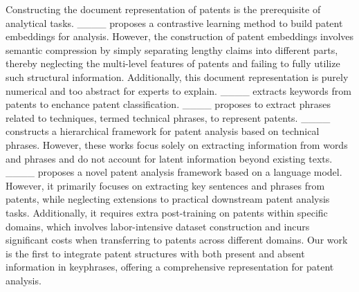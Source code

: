 Constructing the document representation of patents is the prerequisite of analytical tasks.
____ proposes a contrastive learning method to build patent embeddings for analysis. However, the construction of patent embeddings involves semantic compression by simply separating lengthy claims into different parts, thereby neglecting the multi-level features of patents and failing to fully utilize such structural information. Additionally, this document representation is purely numerical and too abstract for experts to explain.
____ extracts keywords from patents to enchance patent classification. ____ proposes to extract phrases related to techniques, termed technical phrases, to represent patents. ____ constructs a hierarchical framework for patent analysis based on technical phrases. However, these works focus solely on extracting information from words and phrases and do not account for latent information beyond existing texts.
____ proposes a novel patent analysis framework based on a language model. However, it primarily focuses on extracting key sentences and phrases from patents, while neglecting extensions to practical downstream patent analysis tasks. Additionally, it requires extra post-training on patents within specific domains, which involves labor-intensive dataset construction and incurs significant costs when transferring to patents across different domains.
Our work is the first to integrate patent structures with both present and absent information in keyphrases, offering a comprehensive representation for patent analysis.